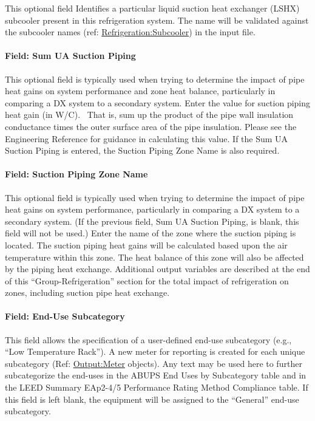 This optional field Identifies a particular liquid suction heat exchanger (LSHX) subcooler present in this refrigeration system. The name will be validated against the subcooler names (ref: \hyperref[refrigerationsubcooler]{Refrigeration:Subcooler}) in the input file.

\paragraph{Field: Sum UA Suction Piping}\label{field-sum-ua-suction-piping}

This optional field is typically used when trying to determine the impact of pipe heat gains on system performance and zone heat balance, particularly in comparing a DX system to a secondary system. Enter the value for suction piping heat gain (in W/C).~ That is, sum up the product of the pipe wall insulation conductance times the outer surface area of the pipe insulation. Please see the Engineering Reference for guidance in calculating this value. If the Sum UA Suction Piping is entered, the Suction Piping Zone Name is also required.

\paragraph{Field: Suction Piping Zone Name}\label{field-suction-piping-zone-name}

This optional field is typically used when trying to determine the impact of pipe heat gains on system performance, particularly in comparing a DX system to a secondary system. (If the previous field, Sum UA Suction Piping, is blank, this field will not be used.) Enter the name of the zone where the suction piping is located. The suction piping heat gains will be calculated based upon the air temperature within this zone. The heat balance of this zone will also be affected by the piping heat exchange. Additional output variables are described at the end of this ``Group-Refrigeration'' section for the total impact of refrigeration on zones, including suction pipe heat exchange.

\paragraph{Field: End-Use Subcategory}\label{field-end-use-subcategory-1-002}

This field allows the specification of a user-defined end-use subcategory (e.g., ``Low Temperature Rack''). A new meter for reporting is created for each unique subcategory (Ref: \hyperref[outputmeter-and-outputmetermeterfileonly]{Output:Meter} objects). Any text may be used here to further subcategorize the end-uses in the ABUPS End Uses by Subcategory table and in the LEED Summary EAp2-4/5 Performance Rating Method Compliance table. If this field is left blank, the equipment will be assigned to the ``General'' end-use subcategory.

